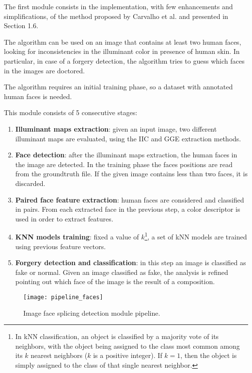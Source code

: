 The first module consists in the implementation, with few enhancements and simplifications, of the method proposed by Carvalho et al. \cite{carvalho2016illuminant} and presented in Section 1.6.

The algorithm can be used on an image that contains at least two human faces, looking for inconsistencies in the illuminant color in presence of human skin. In particular, in case of a forgery detection, the algorithm tries to guess which faces in the images are doctored.

The algorithm requires an initial training phase, so a dataset with annotated human faces is needed. 

This module consists of 5 consecutive stages:

\begin{enumerate}
\item \textbf{Illuminant maps extraction}: given an input image, two different illuminant maps are evaluated, using the IIC and GGE extraction methods.
\item \textbf{Face detection}: after the illuminant maps extraction, the human faces in the image are detected. In the training phase the faces positions are read from the groundtruth file. If the given image contains less than two faces, it is discarded.
\item \textbf{Paired face feature extraction}: human faces are considered and classified in pairs. From each extracted face in the previous step, a color descriptor is used in order to extract features.
\item \textbf{KNN models training}: fixed a value of $k$\footnote{In kNN classification, an object is classified by a majority vote of its neighbors, with the object being assigned to the class most common among its $k$ nearest neighbors ($k$ is a positive integer). If $k = 1$, then the object is simply assigned to the class of that single nearest neighbor.}, a set of kNN models are trained using previous feature vectors.
\item \textbf{Forgery detection and classification}: in this step an image is classified as fake or normal. Given an image classified as fake, the analysis is refined pointing out which face of the image is the result of a composition.
\end{enumerate}

\begin{figure}[h!]
  \centering
    \texttt{[image: pipeline\_faces]}
    \caption{Image face splicing detection module pipeline.}
    \label{fig:facedetectionmodulepipeline}
\end{figure}

